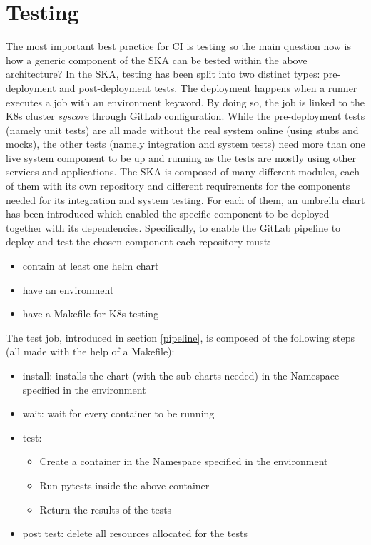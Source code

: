 \documentclass[a4paper,
               keeplastbox,   %
               ]{jacow}
\begin{document}
\section{Testing}
The most important best practice for CI is testing so the main question now is how a generic component of the SKA can be tested within the above architecture?
In the SKA, testing has been split into two distinct types: pre-deployment and post-deployment tests. The deployment happens when a runner executes a job with an environment keyword. By doing so, the job is linked to the K8s cluster \textit{syscore} through GitLab configuration.
While the pre-deployment tests (namely unit tests) are all made without the real system online (using stubs and mocks), the other tests (namely integration and system tests) need more than one live system component to be up and running as the tests are mostly using other services and applications.
The SKA is composed of many different modules, each of them with its own repository and different requirements for the components needed for its integration and system testing. For each of them, an umbrella chart has been introduced which enabled the specific component to be deployed together with its dependencies.
Specifically, to enable the GitLab pipeline to deploy and test the chosen component each repository must:
\begin{itemize}
    \item contain at least one helm chart
    \item have an environment
    \item have a Makefile for K8s testing
\end{itemize}

The test job, introduced in section \ref{pipeline}, is composed of the following steps (all made with the help of a Makefile):
\begin{itemize}
    \item install: installs the chart (with the sub-charts needed) in the Namespace specified in the environment
    \item wait: wait for every container to be running
    \item test:
    \begin{itemize}
        \item Create a container in the Namespace specified in the environment
        \item Run pytests inside the above container
        \item Return the results of the tests
    \end{itemize}
    \item post test: delete all resources allocated for the tests
\end{itemize}
\end{document}
